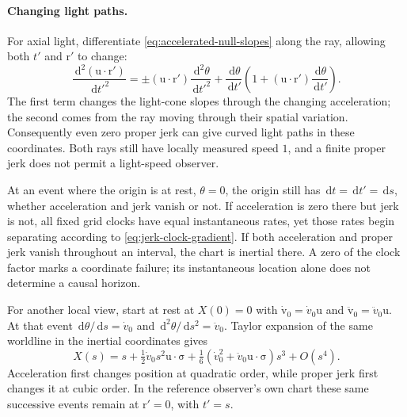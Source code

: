 \documentclass[11pt]{article}
\newcommand{\pv}[1]{{#1}}
\newcommand{\vstyle}[1]{{\bm{\mathrm{#1}}}}
\newcommand{\pX}{\pv{X}}
\numberwithin{equation}{section}
\newcommand{\dotprod}{\cdot}
\newcommand{\bsig}{\vstyle{\sigma}}
\newcommand{\br}{\vstyle{r}}
\newcommand{\bv}{\vstyle{v}}
\newcommand{\bu}{\vstyle{u}}
\newcommand{\dd}{\,\mathrm d}
\begin{document}
\paragraph{Changing light paths.}
For axial light, differentiate \eqref{eq:accelerated-null-slopes} along
the ray, allowing both $t'$ and $\br'$ to change:
\begin{equation}
 \frac{\dd^2(\bu\dotprod\br')}{\dd t'^2}
 =\pm(\bu\dotprod\br')\frac{\dd^2\theta}{\dd t'^2}
 +\frac{\dd\theta}{\dd t'}
 \left(1+(\bu\dotprod\br')\frac{\dd\theta}{\dd t'}\right).
 \label{eq:jerk-null-coordinate-acceleration}
\end{equation}
The first term changes the light-cone slopes through the changing
acceleration; the second comes from the ray moving through their spatial
variation. Consequently even zero proper jerk can give curved light
paths in these coordinates. Both rays still have locally measured speed
$1$, and a finite proper jerk does not permit a light-speed observer.

At an event where the origin is at rest, $\theta=0$, the origin still
has $\dd t=\dd t'=\dd s$, whether acceleration and jerk vanish or not.
If acceleration is zero there but jerk is not, all fixed grid clocks
have equal instantaneous rates, yet those rates begin separating
according to \eqref{eq:jerk-clock-gradient}. If both acceleration and
proper jerk vanish throughout an interval, the chart is inertial there.
A zero of the clock factor marks a coordinate failure; its instantaneous
location alone does not determine a causal horizon.

For another local view, start at rest at $\pX(0)=0$ with
$\dot{\bv}_0=\dot v_0\bu$ and $\ddot{\bv}_0=\ddot v_0\bu$.
At that event $\dd\theta/\dd s=\dot v_0$ and
$\dd^2\theta/\dd s^2=\ddot v_0$. Taylor expansion of the same worldline
in the inertial coordinates gives
\[
 \pX(s)=s+\tfrac12\dot v_0s^2\bu\dotprod\bsig
 +\tfrac16(\dot v_0^2+\ddot v_0\bu\dotprod\bsig)s^3+O(s^4).
\]
Acceleration first changes position at quadratic order, while proper
jerk first changes it at cubic order. In the reference observer's own
chart these same successive events remain at $\br'=0$, with $t'=s$.
\end{document}
